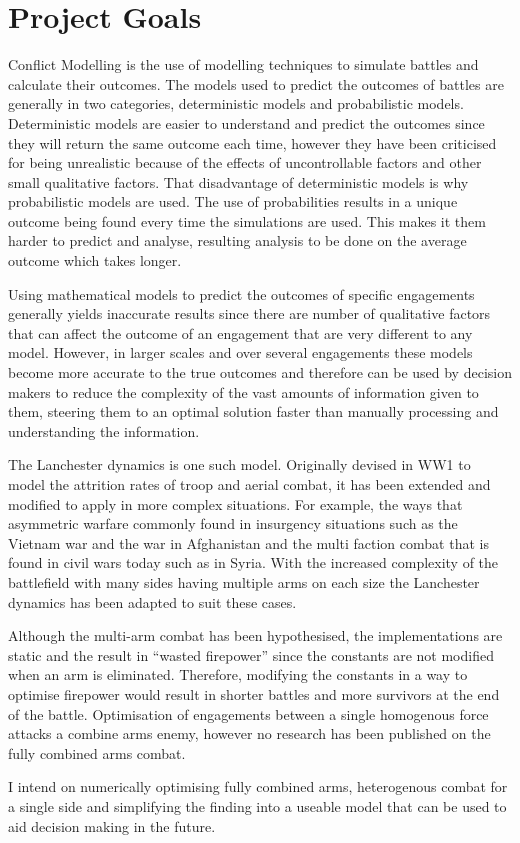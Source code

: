 \chapter{Project Goals} 
Conflict Modelling is the use of modelling techniques to simulate battles and calculate their outcomes. The models used to predict the outcomes of battles are generally in two categories, deterministic models and probabilistic models.\cite{Clausen} Deterministic models are easier to understand and predict the outcomes since they will return the same outcome each time, however they have been criticised for being unrealistic because of the effects of uncontrollable factors and other small qualitative factors. That disadvantage of deterministic models is why probabilistic models are used. The use of probabilities results in a unique outcome being found every time the simulations are used. This makes it them harder to predict and analyse, resulting analysis to be done on the average outcome which takes longer.

Using mathematical models to predict the outcomes of specific engagements generally yields inaccurate results since there are number of qualitative factors that can affect the outcome of an engagement that are very different to any model. However, in larger scales and over several engagements these models become more accurate to the true outcomes and therefore can be used by decision makers to reduce the complexity of the vast amounts of information given to them, steering them to an optimal solution faster than manually processing and understanding the information. 

The Lanchester dynamics is one such model.\cite{lanchester1995aircraft} Originally devised in WW1 to model the attrition rates of troop and aerial combat, it has been extended and modified to apply in more complex situations. For example, the ways that asymmetric warfare commonly found in insurgency situations such as the Vietnam war \cite{Schaffer1969} \cite{Schaffer1967} and the war in Afghanistan \cite{Feichtinger2012} and the multi faction combat that is found in civil wars today such as in Syria. \cite{Kress2018} With the increased complexity of the battlefield with many sides having multiple arms on each size the Lanchester dynamics has been adapted to suit these cases. 

Although the multi-arm combat has been hypothesised, \cite{Colegrave1993} the implementations are static and the result in “wasted firepower” since the constants are not modified when an arm is eliminated. Therefore, modifying the constants in a way to optimise firepower would result in shorter battles and more survivors at the end of the battle. Optimisation of engagements between a single homogenous force attacks a combine arms enemy, \cite{Lin2014} however no research has been published on the fully combined arms combat.

I intend on numerically optimising fully combined arms, heterogenous combat for a single side and simplifying the finding into a useable model that can be used to aid decision making in the future.
